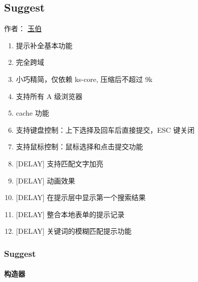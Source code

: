 \documentclass[letterpaper,10pt,english]{sphinxmanual}
\begin{document}
\label{api/component/suggest/index:module-Suggest}

\subsection{Suggest}
\label{api/component/suggest/index:suggest}\label{api/component/suggest/index::doc}
作者： \href{mailto:lifesinger@gmail.com}{玉伯}
\begin{enumerate}
\item {}
提示补全基本功能

\item {}
完全跨域

\item {}
小巧精简，仅依赖 ks-core, 压缩后不超过 9k

\item {}
支持所有 A 级浏览器

\item {}
cache 功能

\item {}
支持键盘控制：上下选择及回车后直接提交，ESC 键关闭

\item {}
支持鼠标控制：鼠标选择和点击提交功能

\item {}
{[}DELAY{]} 支持匹配文字加亮

\item {}
{[}DELAY{]} 动画效果

\item {}
{[}DELAY{]} 在提示层中显示第一个搜索结果

\item {}
{[}DELAY{]} 整合本地表单的提示记录

\item {}
{[}DELAY{]} 关键词的模糊匹配提示功能

\end{enumerate}


\subsubsection{Suggest}
\label{api/component/suggest/suggest:suggest}\label{api/component/suggest/suggest::doc}

\paragraph{构造器}
\label{api/component/suggest/suggest:id1}
\end{document}
